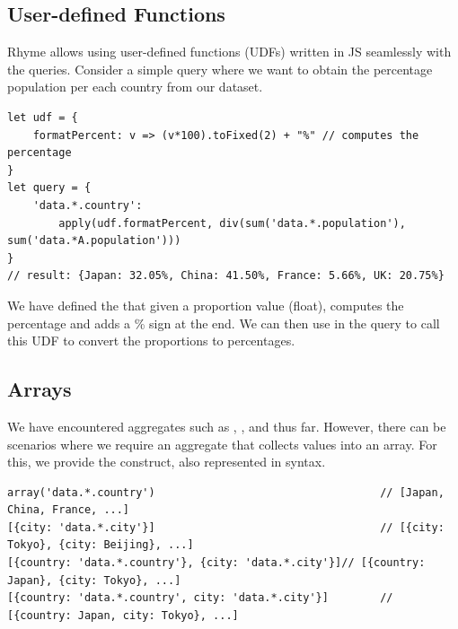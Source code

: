 \documentclass[runningheads]{llncs}
\newcommand{\lang}{Rhyme}
\begin{document}



\subsection{User-defined Functions}
\lang{} allows using user-defined functions (UDFs) written in JS seamlessly with the
queries.
Consider a simple query where we want to obtain the percentage population per each
country from our dataset.

\begin{lstlisting}[style=JavaScript, columns=flexible]
let udf = {
    formatPercent: v => (v*100).toFixed(2) + "%" // computes the percentage 
}
let query = {
    'data.*.country':
        apply(udf.formatPercent, div(sum('data.*.population'), sum('data.*A.population')))
}
// result: {Japan: 32.05%, China: 41.50%, France: 5.66%, UK: 20.75%}
\end{lstlisting}

We have defined the  that given a proportion value (float),
computes the percentage and adds a \% sign at the end.
We can then use  in the query to call this UDF to convert the
proportions to percentages.


\subsection{Arrays}
We have encountered aggregates such as , , and 
thus far.
However, there can be scenarios where we require an aggregate that collects values
into an array.
For this, we provide the  construct, also represented in \inline{[]} syntax.

\begin{lstlisting}[style=JavaScript, columns=flexible]
array('data.*.country')                                   // [Japan, China, France, ...]
[{city: 'data.*.city'}]                                   // [{city: Tokyo}, {city: Beijing}, ...]
[{country: 'data.*.country'}, {city: 'data.*.city'}]// [{country: Japan}, {city: Tokyo}, ...]
[{country: 'data.*.country', city: 'data.*.city'}]        // [{country: Japan, city: Tokyo}, ...]
\end{lstlisting}
\end{document}
